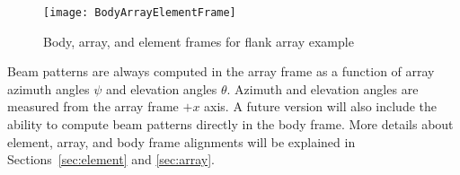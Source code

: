 \begin{figure}[!ht]
\begin{center}
\texttt{[image: BodyArrayElementFrame]}
\caption{\label{fig:ReferenceFrames}Body, array, and element frames for flank array example}
\end{center}
\end{figure}

Beam patterns are always computed in the array frame as a function of array azimuth angles $\psi$ and elevation angles $\theta$. Azimuth and elevation angles are measured from the array frame $+x$ axis. A future version will also include the ability to compute beam patterns directly in the body frame. More details about element, array, and body frame alignments will be explained in Sections~\ref{sec:element} and \ref{sec:array}.
